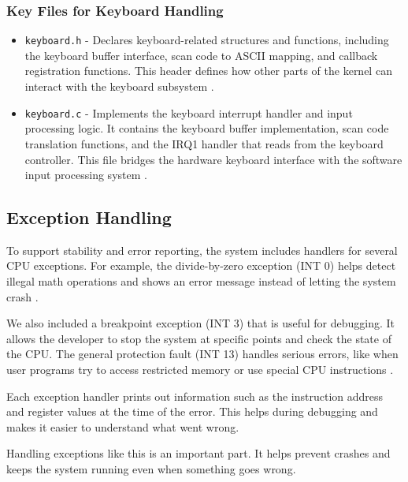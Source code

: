 \documentclass[a4paper,11pt]{article}
\begin{document}
\subsubsection{Key Files for Keyboard Handling}
\begin{itemize}
    \item \texttt{keyboard.h} - Declares keyboard-related structures and functions, including the keyboard buffer interface, scan code to ASCII mapping, and callback registration functions. This header defines how other parts of the kernel can interact with the keyboard subsystem \cite{ASCII} \cite{OSDev_Keyboard}.
    
    \item \texttt{keyboard.c} - Implements the keyboard interrupt handler and input processing logic. It contains the keyboard buffer implementation, scan code translation functions, and the IRQ1 handler that reads from the keyboard controller. This file bridges the hardware keyboard interface with the software input processing system \cite{OSDev_Keyboard} \cite{OSDev_Interrupts}.
\end{itemize}

\subsection{Exception Handling}

To support stability and error reporting, the system includes handlers for several CPU exceptions. For example, the divide-by-zero exception (INT 0) helps detect illegal math operations and shows an error message instead of letting the system crash \cite{OSDev_Exceptions}.

We also included a breakpoint exception (INT 3) that is useful for debugging. It allows the developer to stop the system at specific points and check the state of the CPU. The general protection fault (INT 13) handles serious errors, like when user programs try to access restricted memory or use special CPU instructions \cite{OSDev_Exceptions}.

Each exception handler prints out information such as the instruction address and register values at the time of the error. This helps during debugging and makes it easier to understand what went wrong.

Handling exceptions like this is an important part. It helps prevent crashes and keeps the system running even when something goes wrong.
\end{document}
